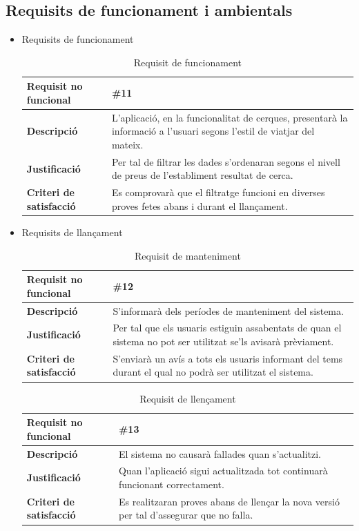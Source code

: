 \subsection{Requisits de funcionament i ambientals}
\begin{itemize}
\item{Requisits de funcionament}

\begin{table}[!h]
\centering
\begin{tabular}{|l|M|}
\hline
\textbf{Requisit no funcional }& \#11    \\ \hline
\textbf{Descripció} & L’aplicació, en la funcionalitat de cerques, presentarà la informació a l’usuari segons l’estil de viatjar del
mateix. \\ \hline
\textbf{Justificació} & Per tal de filtrar les dades s’ordenaran segons el nivell
de preus de l’establiment resultat de cerca. \\ \hline
\textbf{Criteri de satisfacció} & Es comprovarà que el filtratge funcioni en diverses proves fetes abans i durant el llançament. \\ \hline
\end{tabular}
\label{}
\caption{Requisit de funcionament}
\end{table}

\item{Requisits de llançament}

\begin{table}[!h]
\centering
\begin{tabular}{|l|M|}
\hline
\textbf{Requisit no funcional }& \#12    \\ \hline
\textbf{Descripció} & S’informarà dels períodes de manteniment del sistema. \\ \hline
\textbf{Justificació} & Per tal que els usuaris estiguin assabentats de quan el
sistema no pot ser utilitzat se’ls avisarà prèviament. \\ \hline
\textbf{Criteri de satisfacció} & S’enviarà un avís a tots els usuaris informant del tems durant el qual no podrà ser utilitzat el sistema. \\ \hline
\end{tabular}
\label{}
\caption{Requisit de manteniment}
\end{table}

\begin{table}[!h]
\centering
\begin{tabular}{|l|M|}
\hline
\textbf{Requisit no funcional }& \#13   \\ \hline
\textbf{Descripció} & El sistema no causarà fallades quan s’actualitzi.\\ \hline
\textbf{Justificació} & Quan l’aplicació sigui actualitzada tot continuarà
funcionant correctament. \\ \hline
\textbf{Criteri de satisfacció} & Es realitzaran proves abans de llençar la nova versió per tal d’assegurar que no falla.\\ \hline
\end{tabular}
\label{}
\caption{Requisit de llençament}
\end{table}


\end{itemize}

